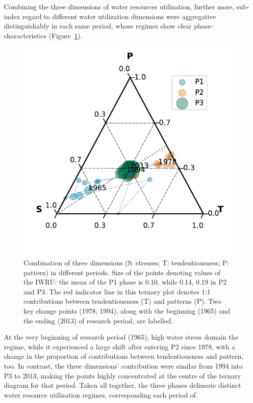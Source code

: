 \documentclass[9pt, twocolumn, twoside, lineno]{pnas-new}
\begin{document}
Combining the three dimensions of water resources utilization, further more, 
sub-index regard to different water utilization dimensions were aggregative distinguishably in each same period, 
whose regimes show clear phase-characteristics (Figure~\ref{fig:phases}).
\begin{figure}%
	\centering
	\includegraphics[width=\linewidth]{../../figures/main_text/phases.pdf}
	\caption{Combination of three dimensions (S: stresses; T: tendentiousness; P: pattern) in different periods. 
	Size of the points denoting values of the IWRU: the mean of the P1 phase is 0.10, while 0.14, 0.19 in P2 and P3.
	The red indicator line in this ternary plot denotes 1:1 contributions between tendentiousness (T) and patterns (P).
	Two key change points (1978, 1994), along with the beginning (1965) and the ending (2013) of research period, are labelled.}
	\label{fig:phases}
\end{figure}
At the very beginning of research period (1965), high water stress domain the regime, 
while it experienced a large shift after entering P2 since 1978, 
with a change in the proportion of contributions between tendentiousness and pattern, too.
In contrast, the three dimensions' contribution were similar from 1994 into P3 to 2013, 
making the points highly concentrated at the centre of the ternary diagram for that period.
Taken all together, the three phases delineate distinct water resource utilization regimes, 
corresponding each period of.
\end{document}
